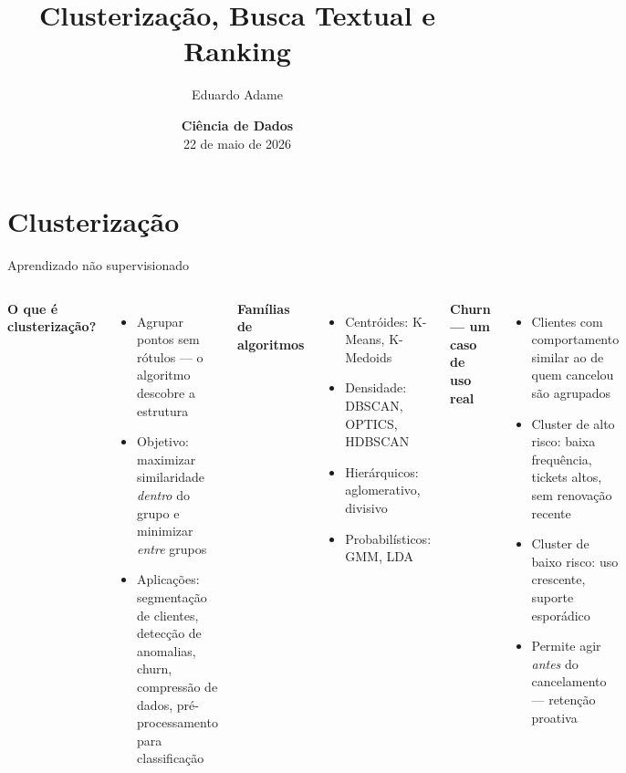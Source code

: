 \documentclass[xcolor=dvipsnames,t,aspectratio=169]{beamer}
\title{Clusterização, Busca Textual e Ranking}
\author{Eduardo Adame}
\date{{\color{nes_dark_purple}\textbf{Ciência de Dados}\\[0.5em] 22 de maio de 2026 }}
\newcommand{\highlight}[1]{{\color{nes_dark_orange} #1}}
\begin{document}
\frame[plain]{\titlepage}
\setcounter{framenumber}{0}


\section{Clusterização}

\begin{frame}[c]{Aprendizado não supervisionado}

\begin{columns}
\textbf{\color{nes_dark_purple}O que é clusterização?}
\begin{itemize}
    \item Agrupar pontos \highlight{sem rótulos} — o algoritmo descobre a estrutura
    \item Objetivo: maximizar similaridade \emph{dentro} do grupo e minimizar \emph{entre} grupos
    \item Aplicações: segmentação de clientes, detecção de anomalias, \highlight{churn}, compressão de dados, pré-processamento para classificação
\end{itemize}
\textbf{\color{nes_dark_purple}Famílias de algoritmos}
\begin{itemize}
    \item \highlight{Centróides}: K-Means, K-Medoids
    \item \highlight{Densidade}: DBSCAN, OPTICS, HDBSCAN
    \item \highlight{Hierárquicos}: aglomerativo, divisivo
    \item \highlight{Probabilísticos}: GMM, LDA
\end{itemize}
\vspace*{.4cm}


\textbf{\color{nes_dark_purple}Churn — um caso de uso real}
\begin{itemize}
    \item Clientes com comportamento similar ao de quem cancelou são agrupados
    \item Cluster de \highlight{alto risco}: baixa frequência, tickets altos, sem renovação recente
    \item Cluster de \highlight{baixo risco}: uso crescente, suporte esporádico
    \item Permite agir \emph{antes} do cancelamento — retenção proativa
\end{itemize}
\end{columns}


\end{frame}
\end{document}
